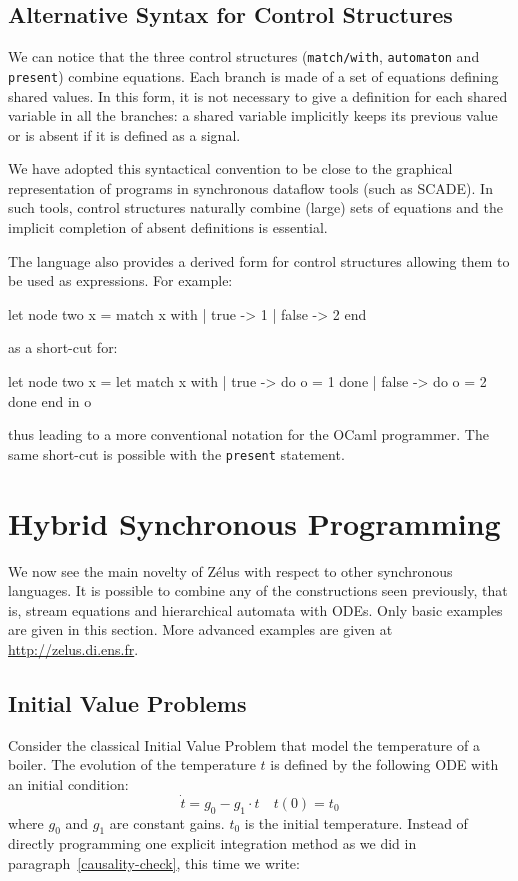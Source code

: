 \documentclass[11pt,titlepage,twoside]{report}
\newcommand{\zelus}{{\sf Z\'elus}}
\newcommand{\scade}{{\sf SCADE}}
\newcommand{\ocaml}{{\sf OCaml}}
\begin{document}
\section{Alternative Syntax for Control Structures}
We can notice that the three control structures (\verb+match/with+,
\verb-automaton- and \verb-present-) combine equations. Each branch is
made of a set of equations defining shared values. In this form, it
is not necessary to give a definition for each shared variable in all the
branches: a shared variable implicitly keeps its previous value or
is absent if it is defined as a signal.

We have adopted this syntactical convention to be close to the graphical
representation of programs in synchronous dataflow tools (such as
\scade). In such tools, control structures naturally combine (large) sets of
equations and the implicit completion of absent definitions is
essential.

The language also provides a derived form for control structures
allowing them to be used as expressions. For example:
%
\begin{runverbatim}
let node two x =
  match x with | true -> 1 | false -> 2 end
\end{runverbatim}
%
as a short-cut for:
\begin{runverbatim}
let node two x =
  let match x with
     |  true -> do o = 1 done
     | false -> do o = 2 done
     end in
  o
\end{runverbatim}
%
thus leading to a more conventional notation for the \ocaml{}
programmer. The same short-cut is possible with the \verb-present- statement.



\chapter{Hybrid Synchronous Programming}
\label{chapter:ode-programming}

We now see the main novelty of \zelus{} with respect to other
synchronous languages. It is possible to combine any of the
constructions seen previously, that is, stream equations and hierarchical
automata with \acp{ODE}. Only
basic examples are given in this section. More advanced examples are
given at \url{http://zelus.di.ens.fr}.

\section{Initial Value Problems}
Consider the classical Initial Value Problem that model the temperature
of a boiler. The evolution of the temperature $t$ is defined by the following
\ac{ODE} with an initial condition:
\[
\dot{t} = g_0 - g_1 \cdot t \quad t(0) = t_0
\]
where $g_0$ and $g_1$ are constant gains. $t_0$ is the initial temperature. Instead
of directly programming one explicit integration method as we did in
paragraph~\ref{causality-check}, this time we write:
\end{document}

